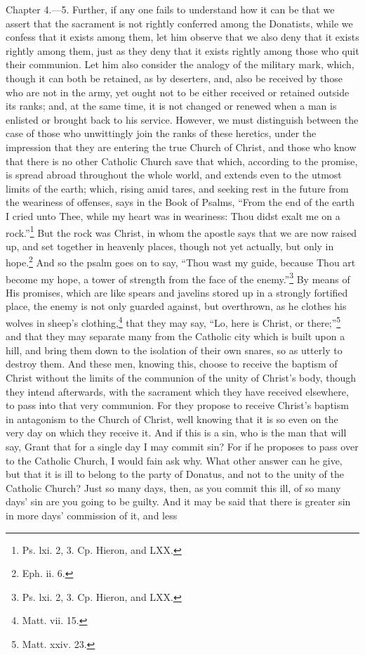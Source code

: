 Chapter 4.—5. Further, if any one fails to understand how it can be that we assert that the sacrament is not rightly conferred among the Donatists, while we confess that it exists among them, let him observe that we also deny that it exists rightly among them, just as they deny that it exists rightly among those who quit their communion. Let him also consider the analogy of the military mark, which, though it can both be retained, as by deserters, and, also be received by those who are not in the army, yet ought not to be either received or retained outside its ranks; and, at the same time, it is not changed or renewed when a man is enlisted or brought back to his service. However, we must distinguish between the case of those who unwittingly join the ranks of these heretics, under the impression that they are entering the true Church of Christ, and those who know that there is no other Catholic Church save that which, according to the promise, is spread abroad throughout the whole world, and extends even to the utmost limits of the earth; which, rising amid tares, and seeking rest in the future from the weariness of offenses, says in the Book of Psalms, ``From the end of the earth I cried unto Thee, while my heart was in weariness: Thou didst exalt me on a rock.''\footnote{\par  Ps. lxi. 2, 3. Cp. Hieron, and LXX.} But the rock was Christ, in whom the apostle says that we are now raised up, and set together in heavenly places, though not yet actually, but only in hope.\footnote{\par  Eph. ii. 6.} And so the psalm goes on to say, ``Thou wast my guide, because Thou art become my hope, a tower of strength from the face of the enemy.''\footnote{\par  Ps. lxi. 2, 3. Cp. Hieron, and LXX.} By means of His promises, which are like spears and javelins stored up in a strongly fortified place, the enemy is not only guarded against, but overthrown, as he clothes his wolves in sheep’s clothing,\footnote{\par  Matt. vii. 15.} that they may say, ``Lo, here is Christ, or there;''\footnote{\par  Matt. xxiv. 23.} and that they may separate many from the Catholic city which is built upon a hill, and bring them down to the isolation of their own snares, so as utterly to destroy them. And these men, knowing this, choose to receive the baptism of Christ without the limits of the communion of the unity of Christ’s body, though they intend afterwards, with the sacrament which they have received elsewhere, to pass into that very communion. For they propose to receive Christ’s baptism in antagonism to the Church of Christ, well knowing that it is so even on the very day on which they receive it. And if this is a sin, who is the man that will say, Grant that for a single day I may commit sin? For if he proposes to pass over to the Catholic Church, I would fain ask why. What other answer can he give, but that it is ill to belong to the party of Donatus, and not to the unity of the Catholic Church? Just so many days, then, as you commit this ill, of so many days’ sin are you going to be guilty. And it may be said that there is greater sin in more days’ commission of it, and less 